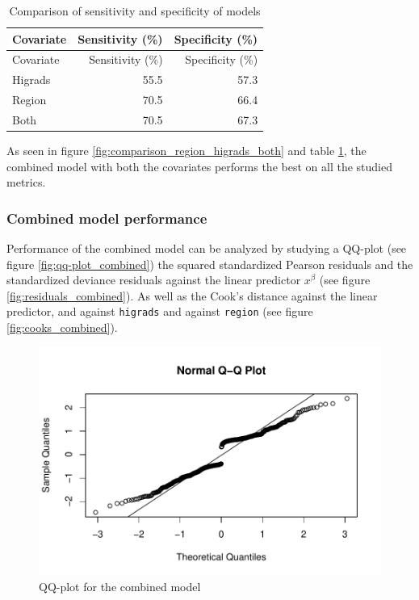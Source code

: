 \documentclass[a4paper]{article}
\begin{document}
\begin{longtable}[]{@{}lrr@{}}
\caption{\label{tab:compare_sense_spec_region_higrad_both}Comparison of
sensitivity and specificity of models}\tabularnewline
\toprule
Covariate & Sensitivity (\%) & Specificity (\%)\tabularnewline
\midrule
\endfirsthead
\toprule
Covariate & Sensitivity (\%) & Specificity (\%)\tabularnewline
\midrule
\endhead
Higrads & 55.5 & 57.3\tabularnewline
Region & 70.5 & 66.4\tabularnewline
Both & 70.5 & 67.3\tabularnewline
\bottomrule
\end{longtable}

As seen in figure \ref{fig:comparison_region_higrads_both} and table
\ref{tab:compare_sense_spec_region_higrad_both}, the combined model with
both the covariates performs the best on all the studied metrics.

\hypertarget{combined-model-performance}{%
\subsubsection{Combined model
performance}\label{combined-model-performance}}

Performance of the combined model can be analyzed by studying a QQ-plot
(see figure \ref{fig:qq-plot_combined}) the squared standardized Pearson
residuals and the standardized deviance residuals against the linear
predictor \(x^{\beta}\) (see figure \ref{fig:residuals_combined}). As
well as the Cook's distance against the linear predictor, and against
\texttt{higrads} and against \texttt{region} (see figure
\ref{fig:cooks_combined}).

\newpage

\begin{figure}[h]
\includegraphics{Project_2_files/figure-latex/unnamed-chunk-10-1} \caption{\label{fig:qq-plot_combined}QQ-plot for the combined model}\label{fig:unnamed-chunk-10}
\end{figure}
\end{document}
